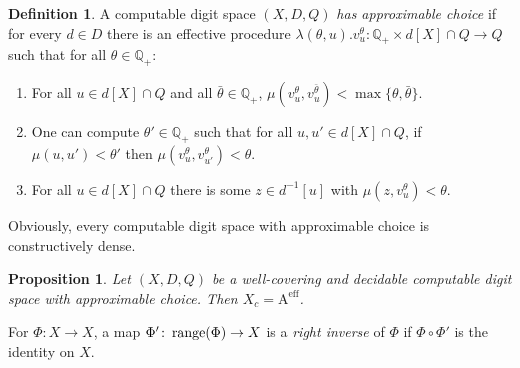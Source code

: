 \documentclass[microtype]{jloganal}
\theoremstyle{plain}
\newtheorem{proposition}[theorem]{Proposition}
\theoremstyle{definition}
\newtheorem{definition}[theorem]{Definition}
\newcommand{\QQ}{\mathbb{Q}}
\newcommand{\fun}[3]{\mbox{$#1 \colon #2 \rightarrow #3$}}
\def\range{\mathop{\mathstrut\rm range}}
\newcommand{\cauchy}{\mathrm{A}}
\begin{document}
\begin{definition}
\label{def-continvdeff}
A computable digit space $(X,D,Q)$ \emph{has approximable choice} if for every
$d\in D$ there is an effective procedure 
$\lambda(\theta,u).v^{\theta}_u : \QQ_+\times d[X]\cap Q \to Q$
such that for all $\theta\in\QQ_+$:
\begin{enumerate}

\item\label{def-continvdeff-1} For all $u \in d[X] \cap Q$ and all $\bar{\theta} \in \QQ_+$, $\mu(v^{\theta}_u, v^{\bar{\theta}}_u) < \max\{ \theta, \bar{\theta} \}$.

\item\label{def-continvdeff-2} One can compute $\theta'\in\QQ_+$ such that for all $u,u'\in d[X] \cap Q$,
if $\mu(u, u') < \theta'$ then 
$\mu(v^{\theta}_u,v^{\theta}_{u'}) < \theta$.

\item\label{def-continvdeff-3} For all $u\in d[X]\cap Q$ there is some $z \in d^{-1}[u]$ with 
$\mu(z, v^{\theta}_u) < \theta$.
\end{enumerate} 
\end{definition} 

Obviously,  every computable digit space with approximable choice is constructively dense.

\begin{proposition}
\label{prop-eqcomp-tte}
Let $(X, D, Q)$ be a well-covering and decidable computable digit space with approximable choice. Then $X_c = \cauchy^\text{eff}$.
\end{proposition}

For $\fun{\Phi}{X}{X}$, a map $\fun{\Phi'}{\range(\Phi)}{X}$ is a \emph{right inverse} of $\Phi$ if $\Phi \circ \Phi'$ is the identity on $X$.
\end{document}
